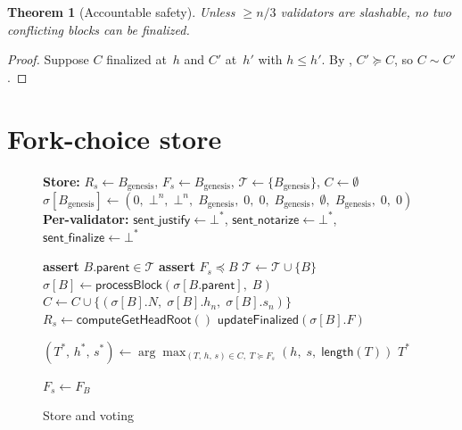 \documentclass{article}
\newcommand{\parent}{\mathsf{parent}}
\newcommand{\sentfinalize}{\mathsf{sent\_finalize}}
\newcommand{\sentjustify}{\mathsf{sent\_justify}}
\newcommand{\sentnotarize}{\mathsf{sent\_notarize}}
\theoremstyle{plain}
\newtheorem{theorem}{Theorem}
\theoremstyle{definition}
\theoremstyle{remark}
\begin{document}
\begin{theorem}[Accountable safety]\label{thm:safety}
Unless $\geq n/3$ validators are slashable, no two conflicting blocks can be finalized.
\end{theorem}

\begin{proof}
Suppose $C$ finalized at~$h$ and $C'$ at~$h'$ with $h \leq h'$.
By , $C' \succeq C$, so $C \sim C'$.
\end{proof}

\section{Fork-choice store}

\begin{figure}[H]
\caption{Store and voting}\label{alg:store}
\begin{center}
\begin{boxedminipage}{\textwidth}
\begin{algorithmic}[1]

\State \textbf{Store:} $R_s \gets B_{\mathrm{genesis}}$, \; $F_s \gets B_{\mathrm{genesis}}$, \; $\mathcal{T} \gets \{B_{\mathrm{genesis}}\}$, \; $C \gets \emptyset$
\State $\sigma[B_{\mathrm{genesis}}] \gets (0,\; \bot^n,\; \bot^n,\; B_{\mathrm{genesis}},\; 0,\; 0,\; B_{\mathrm{genesis}},\; \emptyset,\; B_{\mathrm{genesis}},\; 0,\; 0)$
\State \textbf{Per-validator:} $\sentjustify \gets \bot^*$, \; $\sentnotarize \gets \bot^*$, \; $\sentfinalize \gets \bot^*$
\vspace{3pt}

  \State \textbf{assert} $B.\parent \in \mathcal{T}$ 
  \State \textbf{assert} $F_s \preceq B$ 
  \State $\mathcal{T} \gets \mathcal{T} \cup \{B\}$
  \State $\sigma[B] \gets \textsf{processBlock}(\sigma[B.\parent],\; B)$
  \State $C \gets C \cup \{(\sigma[B].N,\; \sigma[B].h_n,\; \sigma[B].s_n)\}$
  \State $R_s \gets \textsf{computeGetHeadRoot}()$
  \State $\textsf{updateFinalized}(\sigma[B].F)$
\EndFunction
\vspace{3pt}

  \State $(T^*,\, h^*,\, s^*) \gets \arg\max_{(T,\, h,\, s) \in C,\; T \succeq F_s} (h,\; s,\; \mathsf{length}(T))$
  \State \Return $T^*$
\EndFunction
\vspace{3pt}

    \State $F_s \gets F_B$
  \EndIf
\EndFunction
\vspace{3pt}


\end{algorithmic}
\end{boxedminipage}
\end{center}
\end{figure}
\end{document}
